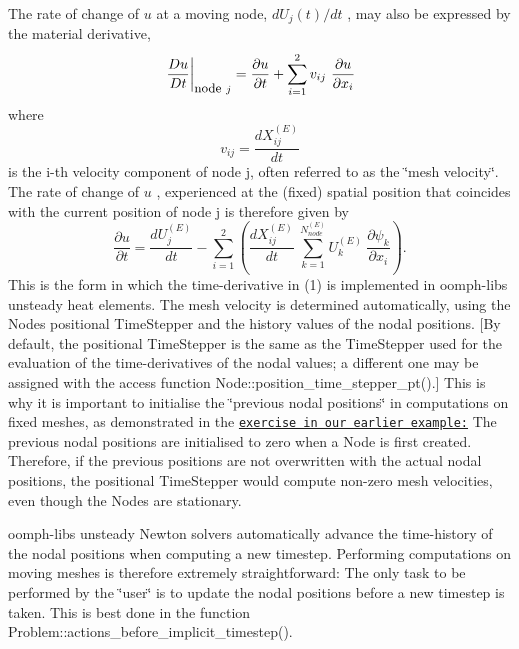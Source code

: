 The rate of change of $ u $ at a moving node, $ dU_j(t)/dt $ , may also be expressed by the material derivative, \[ \left. \frac{D u}{Dt}\right|_{\mbox{\small node} \ j} = \frac{\partial u}{\partial t} + \sum_{i=1}^2 v_{ij} \ \frac{\partial u}{\partial x_i} \] where \[ v_{ij} = \frac{dX_{ij}^{(E)}}{dt} \] is the i-\/th velocity component of node j, often referred to as the \char`\"{}mesh velocity\char`\"{}. The rate of change of $ u $ , experienced at the (fixed) spatial position that coincides with the current position of node j is therefore given by \[ \frac{\partial u}{\partial t} = \frac{d U_j^{(E)}}{dt} - \sum_{i=1}^2 \left( \frac{dX_{ij}^{(E)}}{dt} \ \sum_{k=1}^{N_{node}^{(E)}} U_k^{(E)} \ \frac{\partial \psi_{k}}{\partial x_i} \right) . \] This is the form in which the time-\/derivative in (1) is implemented in {\ttfamily oomph-\/lib\textquotesingle{}s} unsteady heat elements. The mesh velocity is determined automatically, using the {\ttfamily Node\textquotesingle{}s} positional {\ttfamily Time\+Stepper} and the history values of the nodal positions. \mbox{[}By default, the positional {\ttfamily Time\+Stepper} is the same as the {\ttfamily Time\+Stepper} used for the evaluation of the time-\/derivatives of the nodal values; a different one may be assigned with the access function {\ttfamily Node\+::position\+\_\+time\+\_\+stepper\+\_\+pt()}.\mbox{]} This is why it is important to initialise the \char`\"{}previous nodal positions\char`\"{} in computations on fixed meshes, as demonstrated in the \href{../../two_d_unsteady_heat/html/index.html}{\tt exercise in our earlier example\+:} The previous nodal positions are initialised to zero when a {\ttfamily Node} is first created. Therefore, if the previous positions are not overwritten with the actual nodal positions, the positional {\ttfamily Time\+Stepper} would compute non-\/zero mesh velocities, even though the {\ttfamily Nodes} are stationary.

{\ttfamily oomph-\/lib\textquotesingle{}s} unsteady Newton solvers automatically advance the time-\/history of the nodal positions when computing a new timestep. Performing computations on moving meshes is therefore extremely straightforward\+: The only task to be performed by the \char`\"{}user\char`\"{} is to update the nodal positions before a new timestep is taken. This is best done in the function {\ttfamily Problem\+::actions\+\_\+before\+\_\+implicit\+\_\+timestep()}.

